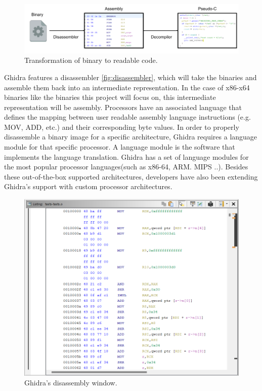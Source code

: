 \label{fig:ghidra}
\begin{figure}[!h]
  \centering
  \includegraphics[width=\linewidth]{img/ghidra.png}
  \caption{Transformation of binary to readable code.}
\end{figure}

Ghidra features a disassembler \ref{fig:disassembler}, which will take the binaries and assemble them back into an intermediate representation. In the case of x86-x64 binaries like the binaries this project will focus on, this intermediate representation will be assembly. Processors have an associated language that defines the mapping
between user readable assembly language instructions (e.g. MOV, ADD, etc.) and their corresponding byte values. In order to properly disassemble a binary image for a specific architecture, Ghidra requires a language module for that specific processor. A language module is the software that implements the language translation. Ghidra has a set of language modules for the most popular processor languages(such as x86-64, ARM. MIPS ..). Besides these out-of-the-box supported architectures, developers have also been extending Ghidra's support with custom processor architectures. 
\label{fig:disassembler}
\begin{figure}[H]
  \centering
  \includegraphics[width=\linewidth]{img/disassembler.png}
  \caption{Ghidra's disassembly window.}
\end{figure}

